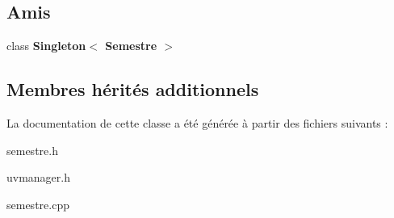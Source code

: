 \subsection*{Amis}
\begin{DoxyCompactItemize}
\item 
\hypertarget{class_semestre_a7b353f5e61182b1b184df63b085726fb}{class {\bfseries Singleton$<$ Semestre $>$}}\label{class_semestre_a7b353f5e61182b1b184df63b085726fb}

\end{DoxyCompactItemize}
\subsection*{Membres hérités additionnels}


La documentation de cette classe a été générée à partir des fichiers suivants \+:\begin{DoxyCompactItemize}
\item 
semestre.\+h\item 
uvmanager.\+h\item 
semestre.\+cpp\end{DoxyCompactItemize}
